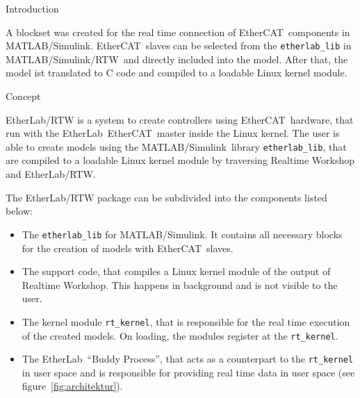 %
%

\begin{ighsec}{Introduction}
\label{sec:einleitung}

A blockset was created for the real time connection of EtherCAT\regTM\ 
components in MATLAB/Simulink\regTM. EtherCAT\regTM\ slaves can be
selected from the \texttt{etherlab\_lib} in MATLAB/Simulink/RTW\regTM\ 
and directly included into the model. After that, the model ist
translated to C code and compiled to a loadable Linux kernel module.

\end{ighsec}


\begin{ighsec}{Concept}
\label{sec:konzept}

EtherLab\regTM/RTW is a system to create controllers using
EtherCAT\regTM\ hardware, that run with the EtherLab\regTM\ 
EtherCAT\regTM\ master inside the Linux kernel. The user is able to
create models using the MATLAB/Simulink\regTM\ library
\texttt{etherlab\_lib}, that are compiled to a loadable Linux kernel
module by traversing Realtime Workshop and EtherLab\regTM/RTW.

The EtherLab\regTM/RTW package can be subdivided into the components
listed below:

\begin{itemize}
\item The \texttt{etherlab\_lib} for MATLAB/Simulink\regTM. It
  contains all necessary blocks for the creation of models with
  EtherCAT\regTM\ slaves.
\item The support code, that compiles a Linux kernel module of the
  output of Realtime Workshop. This happens in background and is not
  visible to the user.
\item The kernel module \texttt{rt\_kernel}, that is responsible for
  the real time execution of the created models. On loading, the
  modules register at the \texttt{rt\_kernel}.
\item The EtherLab\regTM\ ``Buddy Process'', that acts as a
  counterpart to the \texttt{rt\_kernel} in user space and is
  responsible for providing real time data in user space (see
  figure~\ref{fig:architektur}).
\end{itemize}


\end{ighsec}
